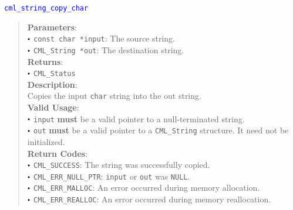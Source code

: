 \documentclass[a4paper,oneside,8pt]{extarticle}
\newcommand{\function}[1]{
  \noindent\textcolor{blue}{\texttt{#1}}
  \vspace{-0.3em}
}
\renewcommand{\dot}{\raisebox{0.3ex}{\scalebox{0.6}{$\bullet$}}}
\theoremstyle{definition}
\begin{document}
\function{cml\_string\_copy\_char}
\begin{quote}
  \textbf{Parameters}: \\
  $\dot$ \texttt{const char *input}: The source string. \\
  $\dot$ \texttt{CML\_String *out}: The destination string. \\
  \textbf{Returns}: \\
  $\dot$ \texttt{CML\_Status} \\

  \vspace{-0.75em}
  \textbf{Description}: \\
  Copies the input \texttt{char} string into the out string. \\

  \vspace{-0.75em}
  \textbf{Valid Usage}: \\
  $\dot$ \texttt{input} \textbf{must} be a valid pointer to a null-terminated string. \\
  $\dot$ \texttt{out} \textbf{must} be a valid pointer to a \texttt{CML\_String} structure. It need not be initialized. \\

  \vspace{-0.75em}
  \textbf{Return Codes}: \\
  $\dot$ \texttt{CML\_SUCCESS}: The string was successfully copied. \\
  $\dot$ \texttt{CML\_ERR\_NULL\_PTR}: \texttt{input} or \texttt{out} was \texttt{NULL}. \\
  $\dot$ \texttt{CML\_ERR\_MALLOC}: An error occurred during memory allocation. \\
  $\dot$ \texttt{CML\_ERR\_REALLOC}: An error occurred during memory reallocation. \\
\end{quote}
\end{document}
